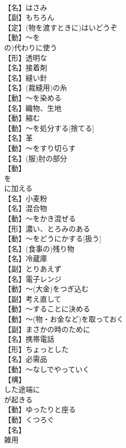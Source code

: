 \documentclass[8pt]{extreport}
\begin{document}
\begin{CJK}{UTF8}{min}
\\	【名】はさみ
\\	【副】もちろん
\\	【定】(物を渡すときに)はいどうぞ
\\	【動】～を
\\	の)代わりに使う
\\	【形】透明な
\\	【名】接着剤
\\	【名】縫い針
\\	【名】(裁縫用)の糸
\\	【動】～を染める
\\	【名】織物、生地
\\	【動】縮む
\\	【動】～を処分する[捨てる]
\\	【名】革
\\	【動】～をすり切らす
\\	【名】(服)肘の部分
\\	【動】
\\	を
\\	に加える
\\	【名】小麦粉
\\	【名】混合物
\\	【動】～をかき混ぜる
\\	【形】濃い、とろみのある
\\	【動】～をどうにかする[扱う]
\\	【名】(食事の)残り物
\\	【名】冷蔵庫
\\	【副】とりあえず
\\	【名】電子レンジ
\\	【動】～(大金)をつぎ込む
\\	【副】考え直して
\\	【動】～することに決める
\\	【動】～(物・お金など)を取っておく
\\	【副】まさかの時のために
\\	【名】携帯電話
\\	【形】ちょっとした
\\	【名】必需品
\\	【動】～なしでやっていく
\\	【構】
\\	した途端に
\\	が起きる
\\	【動】ゆったりと座る
\\	【動】くつろぐ
\\	【名】
\\	雑用

\end{CJK}
\end{document}
